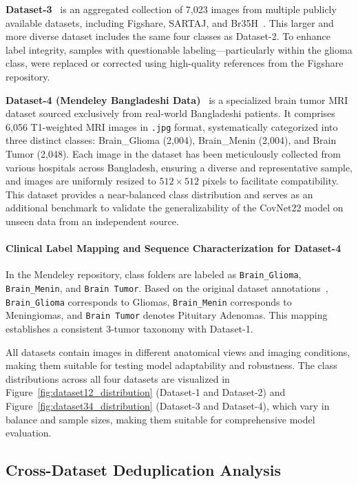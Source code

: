 \documentclass[a4paper,fleqn]{cas-sc}
\begin{document}
\textbf{Dataset-3}~\cite{R40} is an aggregated collection of 7,023 images from multiple publicly available datasets, including Figshare, SARTAJ, and Br35H~\cite{R42}. This larger and more diverse dataset includes the same four classes as Dataset-2. To enhance label integrity, samples with questionable labeling—particularly within the glioma class, were replaced or corrected using high-quality references from the Figshare repository.

\textbf{Dataset-4 (Mendeley Bangladeshi Data)}~\cite{R58} is a specialized brain tumor MRI dataset sourced exclusively from real-world Bangladeshi patients. It comprises 6,056 T1-weighted MRI images in \texttt{.jpg} format, systematically categorized into three distinct classes: Brain\_Glioma (2,004), Brain\_Menin (2,004), and Brain Tumor (2,048). Each image in the dataset has been meticulously collected from various hospitals across Bangladesh, ensuring a diverse and representative sample, and images are uniformly resized to $512 \times 512$ pixels to facilitate compatibility. This dataset provides a near-balanced class distribution and serves as an additional benchmark to validate the generalizability of the CovNet22 model on unseen data from an independent source.

\paragraph{Clinical Label Mapping and Sequence Characterization for Dataset-4}
In the Mendeley repository, class folders are labeled as \texttt{Brain\_Glioma}, \texttt{Brain\_Menin}, and \texttt{Brain Tumor}. Based on the original dataset annotations~\cite{R58}, \texttt{Brain\_Glioma} corresponds to Gliomas, \texttt{Brain\_Menin} corresponds to Meningiomas, and \texttt{Brain Tumor} denotes Pituitary Adenomas. This mapping establishes a consistent 3-tumor taxonomy with Dataset-1.

All datasets contain images in different anatomical views and imaging conditions, making them suitable for testing model adaptability and robustness. The class distributions across all four datasets are visualized in Figure~\ref{fig:dataset12_distribution} (Dataset-1 and Dataset-2) and Figure~\ref{fig:dataset34_distribution} (Dataset-3 and Dataset-4), which vary in balance and sample sizes, making them suitable for comprehensive model evaluation.

\subsection{Cross-Dataset Deduplication Analysis}
\label{sec:dedup}
\end{document}
